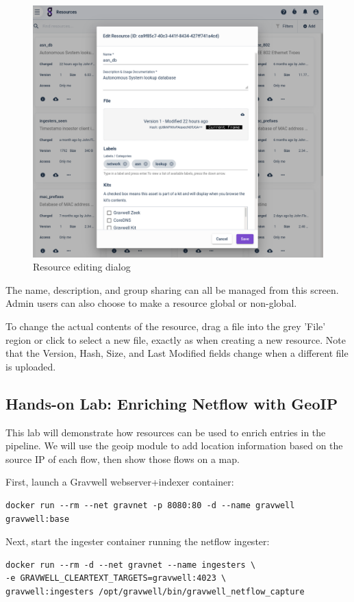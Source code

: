 \begin{figure}
	\includegraphics[width=0.7\linewidth]{images/resource-edit.png}
	\caption{Resource editing dialog}
	\label{fig:resource-edit}
\end{figure}

The name, description, and group sharing can all be managed from this
screen. Admin users can also choose to make a resource global or
non-global.

To change the actual contents of the resource, drag a file into the
grey 'File' region or click to select a new file, exactly as when
creating a new resource. Note that the Version, Hash, Size, and Last
Modified fields change when a different file is uploaded.

\clearpage
\subsection{Hands-on Lab: Enriching Netflow with GeoIP}

This lab will demonstrate how resources can be used to enrich entries
in the pipeline. We will use the geoip module to add location
information based on the source IP of each flow, then show those flows
on a map.

First, launch a Gravwell webserver+indexer container:

\begin{Verbatim}[breaklines=true]
docker run --rm --net gravnet -p 8080:80 -d --name gravwell gravwell:base
\end{Verbatim}

Next, start the ingester container running the netflow ingester:

\begin{Verbatim}[breaklines=true]
docker run --rm -d --net gravnet --name ingesters \
-e GRAVWELL_CLEARTEXT_TARGETS=gravwell:4023 \
gravwell:ingesters /opt/gravwell/bin/gravwell_netflow_capture
\end{Verbatim}

